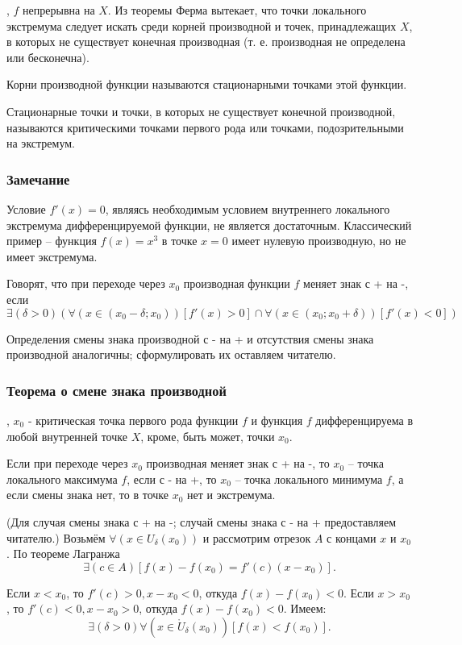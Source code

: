 
\fXR, $f$ непрерывна на $X$. Из теоремы Ферма вытекает, что точки локального экстремума следует искать среди корней производной и точек, принадлежащих $X$, в которых не существует конечная производная (т. е. производная не определена или бесконечна).

\opred
Корни производной функции называются стационарными точками этой функции.

\opred

Стационарные точки и точки, в которых не существует конечной производной, называются критическими точками первого рода или точками, подозрительными на экстремум.

\subsubsection{Замечание}
Условие $f'(x)=0$, являясь необходимым условием внутреннего локального экстремума дифференцируемой функции, не является достаточным. Классический пример -- функция $f(x)=x^3$ в точке $x=0$ имеет нулевую производную, но не имеет экстремума.

\opred 

Говорят, что при переходе через $x_0$ производная функции $f$ меняет знак с + на -, если
$$
\exists(\delta>0)(\forall(x\in(x_0-\delta;x_0))[f'(x)>0] \cap \forall(x\in(x_0;x_0+\delta))[f'(x)<0])
$$

Определения смены знака производной с - на + и отсутствия смены знака производной аналогичны; сформулировать их оставляем читателю.

\subsubsection{Теорема о смене знака производной}

\fXR, $x_0$ - критическая точка первого рода функции $f$ и функция $f$ дифференцируема в любой внутренней точке $X$, кроме, быть может, точки $x_0$.

Если при переходе через $x_0$ производная меняет знак с + на -, то $x_0$ -- точка локального максимума $f$, если с - на +, то $x_0$ -- точка локального минимума $f$, а если смены знака нет, то в точке $x_0$ нет и экстремума.

\dokvo (Для случая смены знака с + на -; случай смены знака с - на + предоставляем читателю.)
Возьмём $\forall(x \in U_\delta(x_0))$ и рассмотрим отрезок $A$ с концами $x$ и $x_0$. По теореме Лагранжа 
$$
\exists(c\in A)[f(x)-f(x_0)=f'(c)(x-x_0)].
$$

Если $x<x_0$, то $f'(c)>0, x-x_0<0$, откуда $f(x)-f(x_0)<0$.
Если $x>x_0$, то $f'(c)<0, x-x_0>0$, откуда $f(x)-f(x_0)<0$.
Имеем:
$$
\exists(\delta>0)\forall(x\in \mathring{U}_\delta(x_0))[f(x)<f(x_0)].
$$

